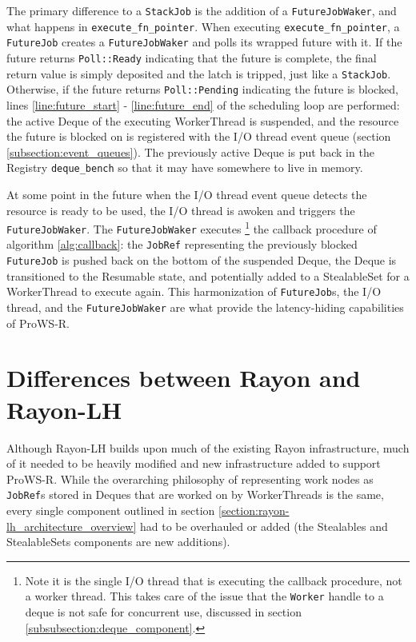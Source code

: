 \documentclass[bsc,frontabs,singlespacing,parskip,deptreport,normalheadings]{infthesis}
\begin{document}
The primary difference to a \texttt{StackJob} is the addition of a
\texttt{FutureJobWaker}, and what happens in \texttt{execute\_fn\_pointer}. When
executing \texttt{execute\_fn\_pointer}, a \texttt{FutureJob} creates a
\texttt{FutureJobWaker} and polls its wrapped future with it. If the future
returns \texttt{Poll::Ready} indicating that the future is complete, the final
return value is simply deposited and the latch is tripped, just like a
\texttt{StackJob}. Otherwise, if the future returns \texttt{Poll::Pending}
indicating the future is blocked, lines \ref{line:future_start} -
\ref{line:future_end} of the scheduling loop are performed: the active Deque of
the executing WorkerThread is suspended, and the resource the future is blocked
on is registered with the I/O thread event queue (section
\ref{subsection:event_queues}). The previously active Deque is put back in the
Registry \texttt{deque\_bench} so that it may have somewhere to live in memory.

At some point in the future when the I/O thread event queue detects the resource
is ready to be used, the I/O thread is awoken and triggers the
\texttt{FutureJobWaker}. The \texttt{FutureJobWaker} executes \footnote{Note it
    is the single I/O thread that is executing the callback procedure, not a
    worker thread. This takes care of the issue that the \texttt{Worker} handle
to a deque is not safe for concurrent use, discussed in section
\ref{subsubsection:deque_component}.} the callback procedure of algorithm
\ref{alg:callback}: the \texttt{JobRef} representing the previously blocked
\texttt{FutureJob} is pushed back on the bottom of the suspended Deque, the
Deque is transitioned to the Resumable state, and potentially added to a
StealableSet for a WorkerThread to execute again. This harmonization of
\texttt{FutureJob}s, the I/O thread, and the \texttt{FutureJobWaker} are what
provide the latency-hiding capabilities of ProWS-R.

\section{Differences between Rayon and Rayon-LH}

Although Rayon-LH builds upon much of the existing Rayon infrastructure, much of
it needed to be heavily modified and new infrastructure added to support
ProWS-R. While the overarching philosophy of representing work nodes as
\texttt{JobRef}s stored in Deques that are worked on by WorkerThreads is the
same, every single component outlined in section
\ref{section:rayon-lh_architecture_overview} had to be overhauled or added (the
Stealables and StealableSets components are new additions).
\end{document}
